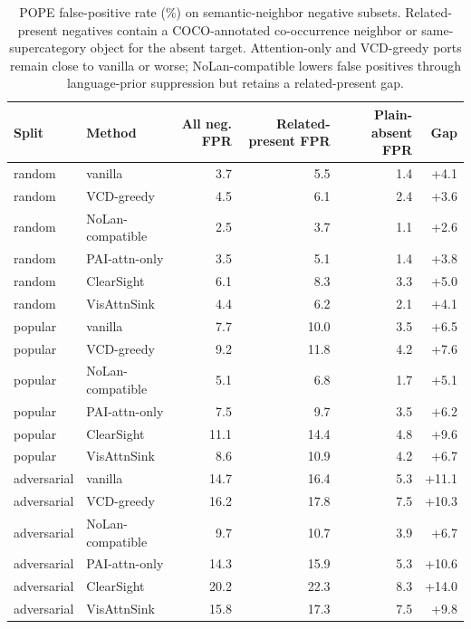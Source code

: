 \begin{table}[t]
\centering
\small
\setlength{\tabcolsep}{4.0pt}
\begin{tabular}{llrrrr}
\toprule
Split & Method & All neg. FPR & Related-present FPR & Plain-absent FPR & Gap \\
\midrule
random & vanilla & 3.7 & 5.5 & 1.4 & +4.1 \\
random & VCD-greedy & 4.5 & 6.1 & 2.4 & +3.6 \\
random & NoLan-compatible & 2.5 & 3.7 & 1.1 & +2.6 \\
random & PAI-attn-only & 3.5 & 5.1 & 1.4 & +3.8 \\
random & ClearSight & 6.1 & 8.3 & 3.3 & +5.0 \\
random & VisAttnSink & 4.4 & 6.2 & 2.1 & +4.1 \\
\midrule
popular & vanilla & 7.7 & 10.0 & 3.5 & +6.5 \\
popular & VCD-greedy & 9.2 & 11.8 & 4.2 & +7.6 \\
popular & NoLan-compatible & 5.1 & 6.8 & 1.7 & +5.1 \\
popular & PAI-attn-only & 7.5 & 9.7 & 3.5 & +6.2 \\
popular & ClearSight & 11.1 & 14.4 & 4.8 & +9.6 \\
popular & VisAttnSink & 8.6 & 10.9 & 4.2 & +6.7 \\
\midrule
adversarial & vanilla & 14.7 & 16.4 & 5.3 & +11.1 \\
adversarial & VCD-greedy & 16.2 & 17.8 & 7.5 & +10.3 \\
adversarial & NoLan-compatible & 9.7 & 10.7 & 3.9 & +6.7 \\
adversarial & PAI-attn-only & 14.3 & 15.9 & 5.3 & +10.6 \\
adversarial & ClearSight & 20.2 & 22.3 & 8.3 & +14.0 \\
adversarial & VisAttnSink & 15.8 & 17.3 & 7.5 & +9.8 \\
\bottomrule
\end{tabular}
\caption{POPE false-positive rate (\%) on semantic-neighbor negative subsets. Related-present negatives contain a COCO-annotated co-occurrence neighbor or same-supercategory object for the absent target. Attention-only and VCD-greedy ports remain close to vanilla or worse; NoLan-compatible lowers false positives through language-prior suppression but retains a related-present gap.}
\label{tab:semantic-neighbor-fpr}
\end{table}
